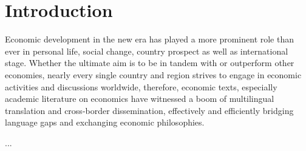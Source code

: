 \chapter*{Introduction}
Economic development in the new era has played a more prominent role than ever in personal life, social change, country prospect as well as international stage. Whether the ultimate aim is to be in tandem with or outperform other economies, nearly every single country and region strives to engage in economic activities and discussions worldwide, therefore, economic texts, especially academic literature on economics have witnessed a boom of multilingual translation and cross-border dissemination, effectively and efficiently bridging language gaps and exchanging economic philosophies.

...

